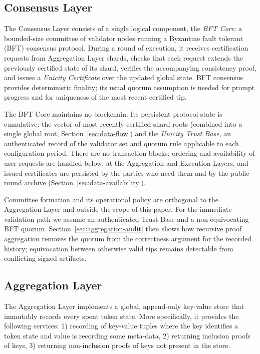 \documentclass[twocolumn]{article}
\begin{document}
\subsection{Consensus Layer}
\label{sec:consensus-layer}

The Consensus Layer consists of a single logical component, the \emph{BFT Core}: a bounded-size committee of validator nodes running a Byzantine fault tolerant (BFT) consensus protocol. During a round of execution, it receives certification requests from Aggregation Layer shards, checks that each request extends the previously certified state of its shard, verifies the accompanying consistency proof, and issues a \emph{Unicity Certificate} over the updated global state. BFT consensus provides deterministic finality; its usual quorum assumption is needed for prompt progress and for uniqueness of the most recent certified tip.

The BFT Core maintains no blockchain. Its persistent protocol state is cumulative: the vector of most recently certified shard roots (combined into a single global root, Section~\ref{sec:data-flow}) and the \emph{Unicity Trust Base}, an authenticated record of the validator set and quorum rule applicable to each configuration period. There are no transaction blocks: ordering and availability of user requests are handled below, at the Aggregation and Execution Layers, and issued certificates are persisted by the parties who need them and by the public round archive (Section~\ref{sec:data-availability}).

Committee formation and its operational policy are orthogonal to the Aggregation Layer and outside the scope of this paper. For the immediate validation path we assume an authenticated Trust Base and a non-equivocating BFT quorum. Section~\ref{sec:aggregation-audit} then shows how recursive proof aggregation removes the quorum from the correctness argument for the recorded history; equivocation between otherwise valid tips remains detectable from conflicting signed artifacts.

\subsection{Aggregation Layer}
\label{sec:sharding-architecture}

The Aggregation Layer implements a global, append-only key-value store that immutably records every spent token state. More specifically, it provides the following services: 1) recording of key-value tuples where the key identifies a token state and value is recording some meta-data, 2) returning inclusion proofs of keys, 3) returning non-inclusion proofs of keys not present in the store.
\end{document}

